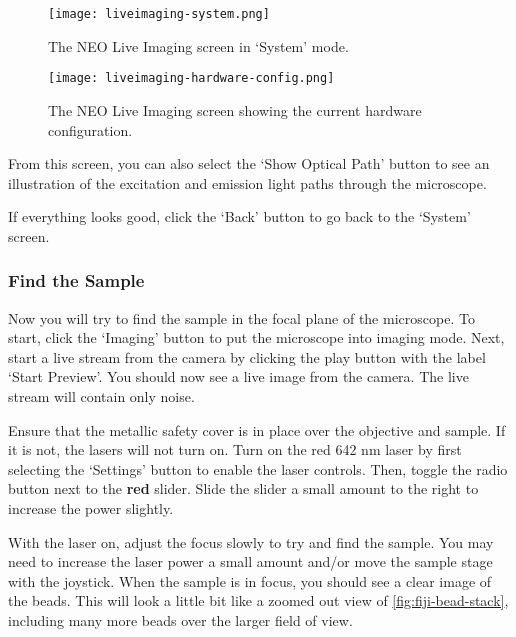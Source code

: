 \documentclass[10pt,a4paper,oneside]{book}
\begin{document}
\begin{figure}[ht]
    \centering
    \texttt{[image: liveimaging-system.png]}
    \caption{The NEO Live Imaging screen in `System' mode.}
    \label{fig:liveimaging-system}
\end{figure}

\begin{figure}[ht]
    \centering
    \texttt{[image: liveimaging-hardware-config.png]}
    \caption{The NEO Live Imaging screen showing the current hardware configuration.}
    \label{fig:liveimaging-hardware-config}
\end{figure}

From this screen, you can also select the `Show Optical Path' button to see an illustration of the excitation and emission light paths through the microscope.

If everything looks good, click the `Back' button to go back to the `System' screen.

\subsubsection{Find the Sample}

\newline

Now you will try to find the sample in the focal plane of the microscope. To start, click the `Imaging' button to put the microscope into imaging mode. Next, start a live stream from the camera by clicking the play button with the label `Start Preview'. You should now see a live image from the camera. The live stream will contain only noise.

Ensure that the metallic safety cover is in place over the objective and sample. If it is not, the lasers will not turn on. Turn on the red 642 nm laser by first selecting the `Settings' button to enable the laser controls. Then, toggle the radio button next to the \textbf{red} slider. Slide the slider a small amount to the right to increase the power slightly.

With the laser on, adjust the focus slowly to try and find the sample. You may need to increase the laser power a small amount and/or move the sample stage with the joystick. When the sample is in focus, you should see a clear image of the beads. This will look a little bit like a zoomed out view of \autoref{fig:fiji-bead-stack}, including many more beads over the larger field of view.
\end{document}
